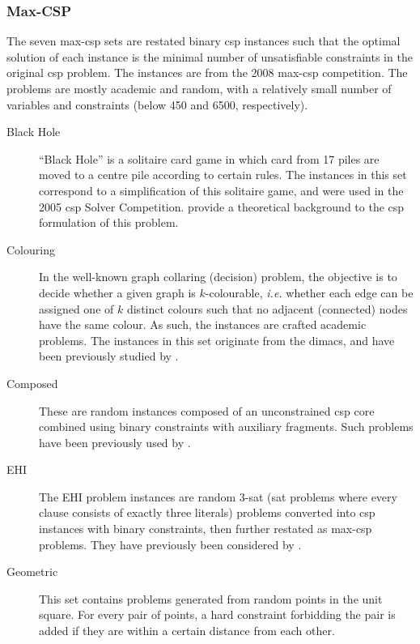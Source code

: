 \subsubsection{Max-CSP}
The seven max-\gls{csp} sets are restated binary \gls{csp} instances such that the optimal solution of each instance is the minimal number of unsatisfiable constraints in the original \gls{csp} problem.
The instances are from the 2008 max-\gls{csp} competition.
The problems are mostly academic and random, with a relatively small number of variables and constraints (below \num{450} and \num{6500}, respectively).

\begin{description}
	\item[Black Hole]
		\enquote{Black Hole} is a solitaire card game in which card from 17 piles are moved to a centre pile according to certain rules.
		The instances in this set correspond to a simplification of this solitaire game, and were used in the 2005 \gls{csp} Solver Competition.
		\Textcite{Gent07} provide a theoretical background to the \gls{csp} formulation of this problem.
	\item[Colouring]
		In the well-known graph collaring (decision) problem, the objective is to decide whether a given graph is \(k\)-colourable, \emph{i.e.} whether each edge can be assigned one of \(k\) distinct colours such that no adjacent (connected) nodes have the same colour.
		As such, the instances are crafted academic problems.
		The instances in this set originate from the \gls{dimacs}, and have been previously studied by \textcite{Benhamou07}.
	\item[Composed]
		These are random instances composed of an unconstrained \gls{csp} core combined using binary constraints with auxiliary fragments.
		Such problems have been previously used by \textcite{Lecoutre04,Jussien00}.
	\item[EHI]
		The EHI problem instances are random 3-\gls{sat} (\gls{sat} problems where every clause consists of exactly three literals) problems converted into \gls{csp} instances with binary constraints, then further restated as max-\gls{csp} problems. They have previously been considered by \textcite{Lecoutre04}.
	\item[Geometric]
		This set contains problems generated from random points in the unit square. For every pair of points, a hard constraint forbidding the pair is added if they are within a certain distance from each other.

\end{description}
